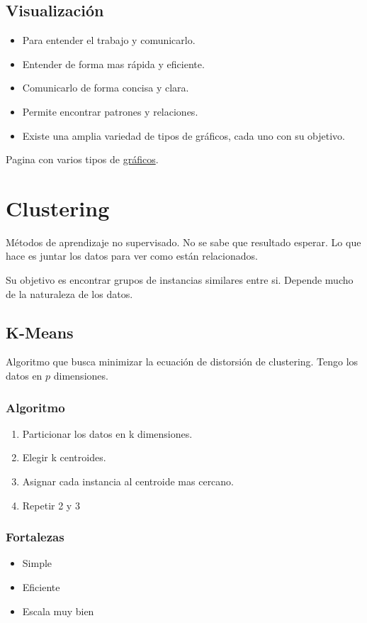 \documentclass[titlepage,a4paper]{article}
\begin{document}
\subsection{Visualización}
\begin{itemize}
    \item Para entender el trabajo y comunicarlo.
    \item Entender de forma mas rápida y eficiente.
    \item Comunicarlo de forma concisa y clara.
    \item Permite encontrar patrones y relaciones.
    \item Existe una amplia variedad de tipos de gráficos, cada uno con su objetivo.
\end{itemize}

Pagina con varios tipos de \href{https://www.python-graph-gallery.com/}{gráficos}.

\newpage

\section{Clustering}

Métodos de aprendizaje no supervisado. No se sabe que resultado esperar. Lo que hace es juntar los datos para ver como están relacionados.

Su objetivo es encontrar grupos de instancias similares entre si. Depende mucho de la naturaleza de los datos.


\subsection{K-Means}
Algoritmo que busca minimizar la ecuación de distorsión de clustering. Tengo los datos en $p$ dimensiones.

\subsubsection*{Algoritmo}
\begin{enumerate}
    \item Particionar los datos en k dimensiones. %
    \item Elegir k centroides.
    \item Asignar cada instancia al centroide mas cercano.
    \item Repetir 2 y 3
\end{enumerate}


\subsubsection*{Fortalezas}
\begin{itemize}
    \item Simple
    \item Eficiente
    \item Escala muy bien
\end{itemize}
\end{document}
